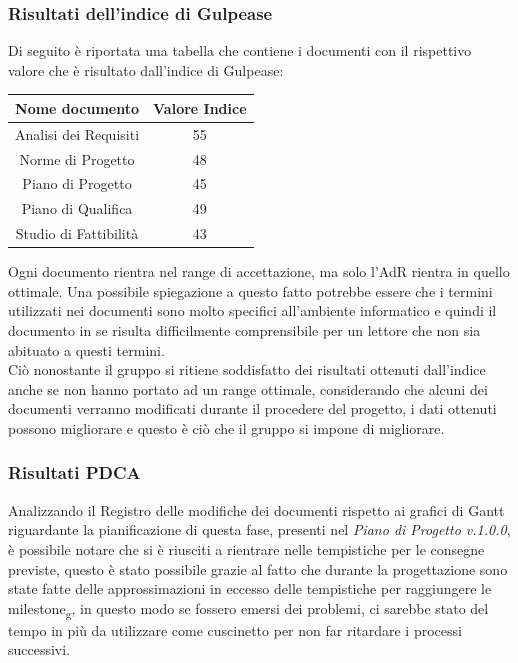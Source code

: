 \documentclass[12pt,a4paper,titlepage]{article}
\begin{document}
	\subsubsection{Risultati dell'indice di Gulpease}
	Di seguito è riportata una tabella che contiene i documenti con il rispettivo valore che è risultato dall'indice di Gulpease:
	\begin{tabular}{|c|c|}
    	{\textbf{Nome documento}}&{\textbf{Valore Indice}}\\
    	\hline
    	Analisi dei Requisiti & 55\\
    	\hline
    	Norme di Progetto & 48\\
    	\hline
    	Piano di Progetto & 45\\
    	\hline
    	Piano di Qualifica & 49\\
    	\hline
    	Studio di Fattibilità & 43\\
    \end{tabular}
    Ogni documento rientra nel range di accettazione, ma solo l'AdR rientra in quello ottimale. Una possibile spiegazione a questo fatto potrebbe essere che i termini utilizzati nei documenti sono molto specifici all'ambiente informatico e quindi il documento in se risulta difficilmente comprensibile 
    per un lettore che non sia abituato a questi termini.\\
    Ciò nonostante il gruppo si ritiene soddisfatto dei risultati ottenuti dall'indice anche se non hanno portato ad un range ottimale, considerando che alcuni dei documenti verranno modificati durante il procedere del progetto, i dati ottenuti possono migliorare e questo è ciò che il gruppo si impone di migliorare.\\
    
    \subsubsection{Risultati PDCA}
    Analizzando il Registro delle modifiche dei documenti rispetto ai grafici di Gantt riguardante la pianificazione di questa fase, presenti nel \textit{Piano di Progetto v.1.0.0}, è possibile notare che si è riusciti a rientrare nelle tempistiche per le consegne previste, questo è stato possibile grazie al fatto che durante la progettazione sono state fatte delle approssimazioni in eccesso delle tempistiche per raggiungere le milestone\textsubscript{g},
    in questo modo se fossero emersi dei problemi, ci sarebbe stato del tempo in più da utilizzare come cuscinetto per non far ritardare i processi successivi.
    
\end{document}
